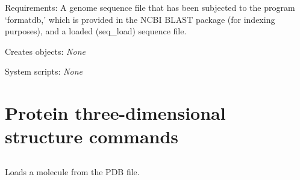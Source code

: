 \begin{description}
\begin{enumerate}
\end{enumerate}


\item{Requirements:} A genome sequence file that has been subjected to
                     the program `formatdb,' which is provided in the
                     NCBI BLAST package (for indexing purposes), and
                     a loaded (seq\_load) sequence file.


\item{Creates objects:} {\em None}


\item{System scripts:} {\em None}

\end{description}


\section{Protein three-dimensional structure commands}


\subsection[mol\_load]{  }



Loads a molecule from the PDB file.


